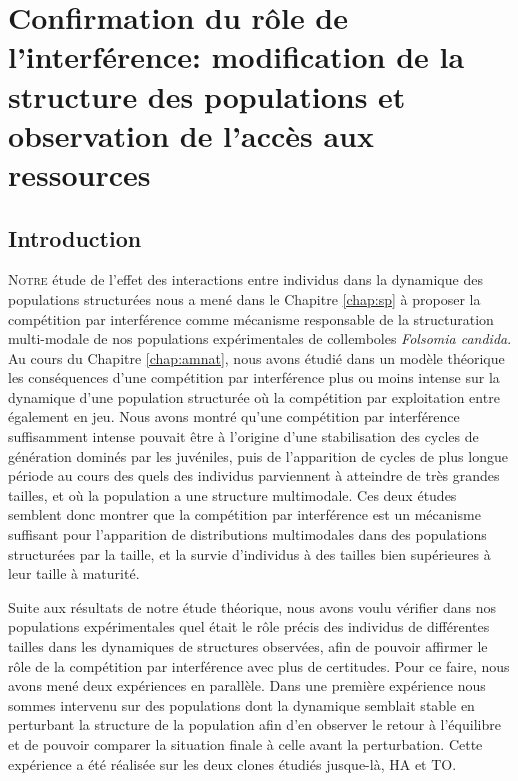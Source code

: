 \chapter{Confirmation du rôle de l'interférence: modification de la structure
des populations et observation de l'accès aux ressources}
\label{chap:sm}

\vspace{5cm}

\section{Introduction}

\lettrine[lines=3]{N}{otre} étude de l'effet des interactions entre individus
dans la dynamique des populations structurées nous a mené dans le Chapitre \ref{chap:sp} à proposer la
compétition par interférence comme mécanisme responsable de la structuration
multi-modale de nos populations expérimentales de collemboles \textit{Folsomia
candida}. Au cours du Chapitre \ref{chap:amnat}, nous avons étudié dans un
modèle théorique les conséquences d'une compétition par interférence plus ou
moins intense sur la dynamique d'une population structurée où la compétition par
exploitation entre également en jeu. Nous avons montré qu'une compétition par
interférence suffisamment intense pouvait être à l'origine d'une stabilisation
des cycles de génération dominés par les juvéniles, puis de l'apparition de
cycles de plus longue période au cours des quels des individus parviennent à
atteindre de très grandes tailles, et où la population a une structure
multimodale. Ces deux études semblent donc montrer que la compétition par
interférence est un mécanisme suffisant pour l'apparition de distributions
multimodales dans des populations structurées par la taille, et la survie
d'individus à des tailles bien supérieures à leur taille à maturité.

Suite aux résultats de notre étude théorique, nous avons voulu vérifier dans nos
populations expérimentales quel était le rôle précis des individus de
différentes tailles dans les dynamiques de structures observées, afin de pouvoir
affirmer le rôle de la compétition par interférence avec plus de certitudes.
Pour ce faire, nous avons mené deux expériences en parallèle. Dans une première
expérience nous sommes intervenu sur des populations dont la dynamique semblait
stable en perturbant la structure de la population afin d'en observer le retour
à l'équilibre et de pouvoir comparer la situation finale à celle avant la
perturbation. Cette expérience a été réalisée sur les deux clones étudiés
jusque-là, HA et TO.

